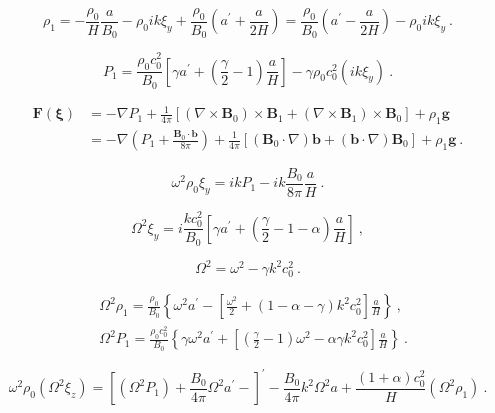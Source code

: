 \documentclass[12pt,a4paper]{article}
\renewcommand{\vec}[1]{\boldsymbol{#1}}
\begin{document}
\begin{equation*}
\rho_1 = -\frac{\rho_0}{H} \frac{a}{B_0} -\rho_0 i k\xi_y + \frac{\rho_0}{B_0} \left(a^\prime +\frac{a}{2H} \right) = \frac{\rho_0}{B_0} \left(a^\prime -\frac{a}{2H} \right) -\rho_0 i k \xi_y ~.
\end{equation*}

\begin{equation*}
P_1 = \frac{\rho_0 c_0^2}{B_0} \left[\gamma a^\prime +\left(\frac{\gamma}{2} -1 \right) \frac{a}{H}\right] -\gamma \rho_0 c_0^2 (ik\xi_y) ~.
\end{equation*}

\begin{align*}
\vec{F}(\vec{\xi}) &= -\nabla P_1 + \frac{1}{4\pi} \left[(\nabla \times \vec{B}_0)\times \vec{B}_1 + (\nabla \times \vec{B}_1)\times \vec{B}_0\right] +\rho_1 \vec{g} \\
&= -\nabla \left( P_1 +\frac{\vec{B}_0\cdot \vec{b}}{8\pi} \right) + \frac{1}{4\pi}\left[(\vec{B}_0\cdot \nabla)\vec{b} +(\vec{b}\cdot \nabla)\vec{B}_0 \right] +\rho_1 \vec{g} ~.
\end{align*}

\begin{equation*}
\omega^2 \rho_0 \xi_y = ik P_1 -ik \frac{B_0}{8\pi} \frac{a}{H} ~.
\end{equation*}

\begin{equation}
\Omega^2 \xi_y = i \frac{kc_0^2}{B_0} \left[\gamma a^\prime +\left(\frac{\gamma}{2} -1 -\alpha\right) \frac{a}{H} \right] ~,
\end{equation}

\begin{equation*}
\Omega^2 = \omega^2 -\gamma k^2 c_0^2 ~.
\end{equation*}

\begin{align*}
& \Omega^2 \rho_1 = \frac{\rho_0}{B_0} \left\{\omega^2 a^\prime -\left[\frac{\omega^2}{2} +(1-\alpha-\gamma) k^2 c_0^2 \right] \frac{a}{H} \right\} ~, \\
& \Omega^2 P_1 = \frac{\rho_0 c_0^2}{B_0} \left\{\gamma \omega^2 a^\prime +\left[\left( \frac{\gamma}{2} -1 \right)\omega^2 -\alpha\gamma k^2 c_0^2 \right] \frac{a}{H} \right\} ~.
\end{align*}

\begin{equation*}
\omega^2 \rho_0( \Omega^2 \xi_z) = \left[\left(\Omega^2 P_1 \right) +\frac{B_0}{4\pi} \Omega^2 a^\prime - \right]^\prime -\frac{B_0}{4\pi} k^2 \Omega^2 a + \frac{(1+\alpha) c_0^2}{H} (\Omega^2 \rho_1) ~.
\end{equation*}
\end{document}
